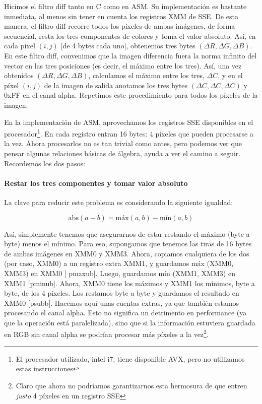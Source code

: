 Hicimos el filtro {\ttfamily diff} tanto en C como en ASM. Su
implementación es bastante inmediata, al menos sin tener en cuenta los
registros {\ttfamily XMM} de {\ttfamily SSE}. De esta manera, el
filtro {\ttfamily diff} recorre todos los píxeles de ambas imágenes,
de forma secuencial, resta los tres componentes de colores y toma el
valor absoluto. Así, en cada píxel $(i, j)$ [de 4 bytes cada uno],
obtenemos tres bytes $(\Delta R, \Delta G, \Delta B)$. En este filtro
{\ttfamily diff}, convenimos que la imagen diferencia fuera la norma
infinito del vector en las tres posiciones (es decir, el máximo entre
los tres). Así, una vez obtenidos $(\Delta R, \Delta G, \Delta B)$,
calculamos el máximo entre los tres, $\Delta C$, y en el píxel
$(i, j)$ de la imagen de salida anotamos los tres bytes
$(\Delta C, \Delta C, \Delta C)$ y 0xFF en el canal
alpha. Repetimos este procedimiento para todos los píxeles de la
imagen.

En la implementación de ASM, aprovechamos los registros {\ttfamily
  SSE} disponibles en el procesador\footnote{El procesador utilizado,
  intel i7, tiene disponible {\ttfamily AVX}, pero no utilizamos estas
  instrucciones}. En cada registro entran 16 bytes: 4 píxeles que
pueden procesarse a la vez. Ahora procesarlos no es tan trivial como
antes, pero podemos ver que pensar algunas relaciones básicas de
álgebra, ayuda a ver el camino a seguir. Recordemos los dos pasos:

\paragraph{Restar los tres componentes y tomar valor absoluto} La clave
para reducir este problema es considerando la siguiente igualdad:

\begin{equation}
  \text{abs}(a - b) = \text{máx}(a, b) - \text{mín}(a, b)
\end{equation}

Así, simplemente tenemos que asegurarnos de estar restando el máximo
(byte a byte) menos el mínimo. Para eso, supongamos que tenemos las
tiras de 16 bytes de ambas imágenes en {\ttfamily XMM0} y {\ttfamily
  XMM3}. Ahora, copiamos cualquiera de los dos (por caso, {\ttfamily
  XMM0}) a un registro extra {\ttfamily XMM1}, y guardamos
{\ttfamily máx (XMM0, XMM3)} en {\ttfamily XMM0} [{\ttfamily
  pmaxub}]. Luego, guardamos {\ttfamily mín (XMM1, XMM3)} en
{\ttfamily XMM1} [{\ttfamily pminub}]. Ahora, {\ttfamily XMM0} tiene
los máximos y {\ttfamily XMM1} los mínimos, byte a byte, de los 4
píxeles. Los restamos byte a byte y guardamos el resultado en
{\ttfamily XMM0} [{\ttfamily psubb}]. Hacemos aquí unas cuentas
extras, ya que también estamos procesando el canal alpha. Esto no
significa un detrimento en performance (ya que la operación está
paralelizada), sino que si la información estuviera guardada en RGB
sin canal alpha se podrían procesar más píxeles a la
vez\footnote{Claro que ahora no podríamos garantizarnos esta
  hermosura de que entren \emph{justo} 4 píxeles en un registro
  {\ttfamily SSE}}.

